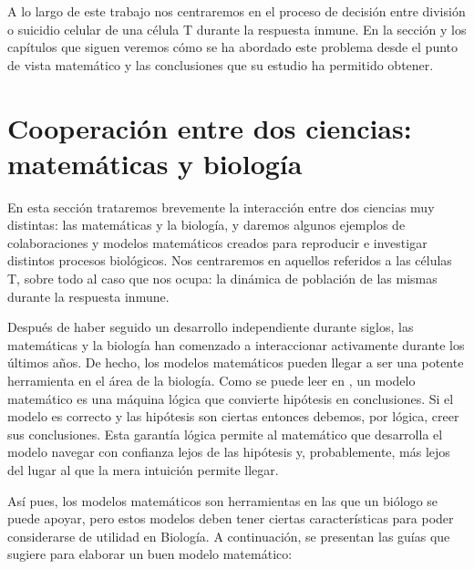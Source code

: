 A lo largo de este trabajo nos centraremos en el proceso de decisión entre división o suicidio celular de una célula T durante la respuesta inmune. En la sección y los capítulos que siguen veremos cómo se ha abordado este problema desde el punto de vista matemático y las conclusiones que su estudio ha permitido obtener. 


\section{Cooperación entre dos ciencias: matemáticas y biología}
\label{sec:coop}

En esta sección trataremos brevemente la interacción entre dos ciencias muy distintas: las matemáticas y la biología, y daremos algunos ejemplos de colaboraciones y modelos matemáticos creados para reproducir e investigar distintos procesos biológicos. Nos centraremos en aquellos referidos a las células T, sobre todo al caso que nos ocupa: la dinámica de población de las mismas durante la respuesta inmune.

Después de haber seguido un desarrollo independiente durante siglos, las matemáticas y la biología han comenzado a interaccionar activamente durante los últimos años. De hecho, los modelos matemáticos pueden llegar a ser una potente herramienta en el área de la biología. Como se puede leer en \cite{Gunawardena2014}, un modelo matemático es una máquina lógica que convierte hipótesis en conclusiones. Si el modelo es correcto y las hipótesis son ciertas entonces debemos, por lógica, creer sus conclusiones. Esta garantía lógica permite al matemático que desarrolla el modelo navegar con confianza lejos de las hipótesis y, probablemente, más lejos del lugar al que la mera intuición permite llegar.

Así pues, los modelos matemáticos son herramientas en las que un biólogo se puede apoyar, pero estos modelos deben tener ciertas características para poder considerarse de utilidad en Biología. A continuación, se presentan las guías que sugiere \cite{Gunawardena2014} para elaborar un buen modelo matemático:

